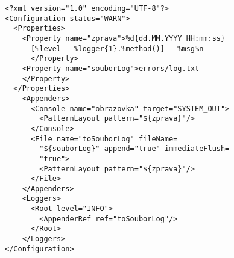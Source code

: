 	\begin{lstlisting}[basicstyle=\ttfamily, frame=single, caption={Konfigurace logeru}, label={konfigurace}]
<?xml version="1.0" encoding="UTF-8"?>
<Configuration status="WARN">
  <Properties>
    <Property name="zprava">%d{dd.MM.YYYY HH:mm:ss}
      [%level - %logger{1}.%method()] - %msg%n
      </Property>
    <Property name="souborLog">errors/log.txt
    </Property>
  </Properties>
    <Appenders>
      <Console name="obrazovka" target="SYSTEM_OUT">
        <PatternLayout pattern="${zprava}"/>
      </Console>
      <File name="toSouborLog" fileName=
        "${souborLog}" append="true" immediateFlush=
        "true">
        <PatternLayout pattern="${zprava}"/>
      </File>
    </Appenders>
    <Loggers>
      <Root level="INFO">
        <AppenderRef ref="toSouborLog"/>
      </Root>
    </Loggers>
</Configuration>
	\end{lstlisting}